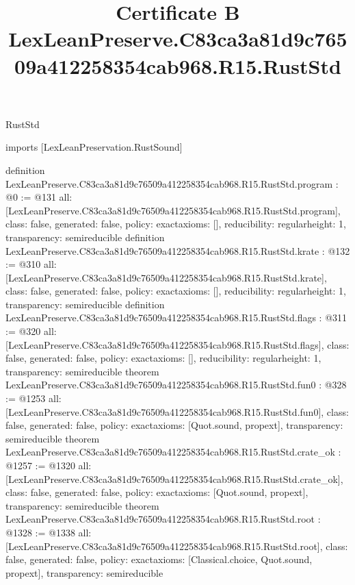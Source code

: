 \begin{lexlean}{RustStd}
\title{Certificate B LexLeanPreserve.C83ca3a81d9c76509a412258354cab968.R15.RustStd}
\begin{coremodule}
imports [LexLeanPreservation.RustSound]

definition LexLeanPreserve.C83ca3a81d9c76509a412258354cab968.R15.RustStd.program : @0 := @131 {
  all: [LexLeanPreserve.C83ca3a81d9c76509a412258354cab968.R15.RustStd.program],
  class: false,
  generated: false,
  policy: exact{axioms: []},
  reducibility: regular{height: 1},
  transparency: semireducible
}
definition LexLeanPreserve.C83ca3a81d9c76509a412258354cab968.R15.RustStd.krate : @132 := @310 {
  all: [LexLeanPreserve.C83ca3a81d9c76509a412258354cab968.R15.RustStd.krate],
  class: false,
  generated: false,
  policy: exact{axioms: []},
  reducibility: regular{height: 1},
  transparency: semireducible
}
definition LexLeanPreserve.C83ca3a81d9c76509a412258354cab968.R15.RustStd.flags : @311 := @320 {
  all: [LexLeanPreserve.C83ca3a81d9c76509a412258354cab968.R15.RustStd.flags],
  class: false,
  generated: false,
  policy: exact{axioms: []},
  reducibility: regular{height: 1},
  transparency: semireducible
}
theorem LexLeanPreserve.C83ca3a81d9c76509a412258354cab968.R15.RustStd.fun0 : @328 := @1253 {
  all: [LexLeanPreserve.C83ca3a81d9c76509a412258354cab968.R15.RustStd.fun0],
  class: false,
  generated: false,
  policy: exact{axioms: [Quot.sound, propext]},
  transparency: semireducible
}
theorem LexLeanPreserve.C83ca3a81d9c76509a412258354cab968.R15.RustStd.crate_ok : @1257 := @1320 {
  all: [LexLeanPreserve.C83ca3a81d9c76509a412258354cab968.R15.RustStd.crate_ok],
  class: false,
  generated: false,
  policy: exact{axioms: [Quot.sound, propext]},
  transparency: semireducible
}
theorem LexLeanPreserve.C83ca3a81d9c76509a412258354cab968.R15.RustStd.root : @1328 := @1338 {
  all: [LexLeanPreserve.C83ca3a81d9c76509a412258354cab968.R15.RustStd.root],
  class: false,
  generated: false,
  policy: exact{axioms: [Classical.choice, Quot.sound, propext]},
  transparency: semireducible
}


\end{coremodule}
\end{lexlean}
